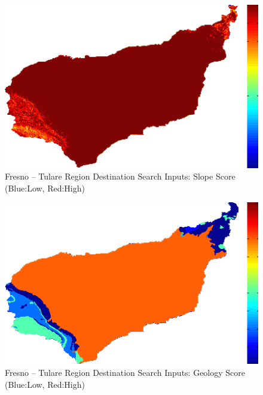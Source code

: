         \begin{figure}[!h]
            \begin{center}
            \includegraphics[width=5.5in]{figures/Fresno_Search_Slope.png}   
            \caption{Fresno -- Tulare Region Destination Search Inputs: Slope Score (Blue:Low, Red:High)}
            \label{fig:Fdsinputs_slope}
            \end{center}
        \end{figure}
        
        \begin{figure}[!h]
            \begin{center}
            \includegraphics[width=5.5in]{figures/Fresno_Search_Geology.png}   
            \caption{Fresno -- Tulare Region Destination Search Inputs: Geology Score (Blue:Low, Red:High)}
            \label{fig:Fdsinputs_geology}
            \end{center}
        \end{figure}
    
